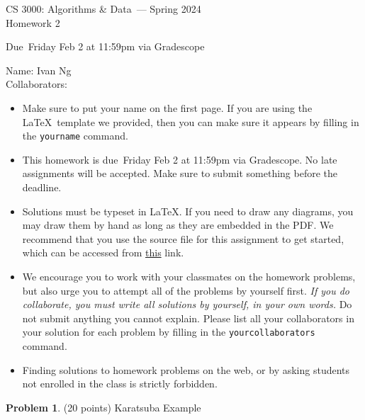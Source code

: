 \documentclass[11pt]{article}
\newcommand{\yourname}{Ivan Ng}
\newcommand{\yourcollaborators}{}
\theoremstyle{definition}
\theoremstyle{theorem}
\newtheorem{prob}{Problem}
\newcommand{\course}{CS 3000: Algorithms \& Data}
\newcommand{\semester}{Spring 2024}
\newcommand{\hwnum}{1}
\newcommand{\hwdue}{Friday Feb 2 at 11:59pm via Gradescope}
\begin{document}
{\Large 
\begin{center} 
\course\ --- \semester\  \\
Homework 2
\end{center}
}
{\large
\vspace{10pt}
Due~\hwdue}

\vspace{15pt}
\bigskip
{\large
\noindent Name: \yourname \vspace{2pt}\\ Collaborators: \yourcollaborators}

\vspace{15pt}
\begin{itemize}

\item
  Make sure to put your name on the first page.  If you are using the
  \LaTeX~template we provided, then you can make sure it appears by
  filling in the \texttt{yourname} command.

\item This homework is due~\hwdue.  No late assignments will be accepted.  Make sure to submit something before the deadline.

\item Solutions must be typeset in \LaTeX.  If you need to draw any diagrams,
  you may draw them by hand as long as they are embedded in the PDF.
  We recommend that you use the source file for this assignment to get started, which can be accessed from \href{https://www.overleaf.com/read/nggnrncbmbvm#d72762}{this} link.

\item We encourage you to work with your classmates on the homework
  problems, but also urge you to attempt all of the problems by
  yourself first. \emph{If you do collaborate, you must write all
    solutions by yourself, in your own words.}  Do not submit anything
  you cannot explain.  Please list all your collaborators in your
  solution for each problem by filling in the
  \texttt{yourcollaborators} command.

\item Finding solutions to homework problems on the web, or by asking
  students not enrolled in the class is strictly forbidden.

\end{itemize}
\newpage


\newpage
\begin{prob} (20 points) Karatsuba Example \end{prob}
\end{document}

